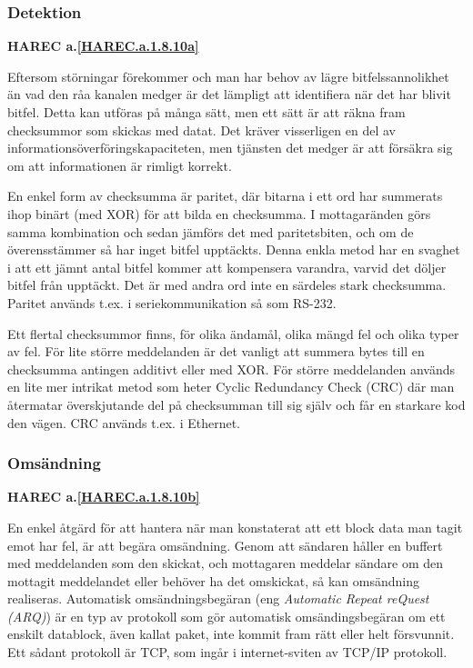 \subsubsection{Detektion}
\textbf{HAREC a.\ref{HAREC.a.1.8.10a}\label{myHAREC.a.1.8.10a}}
\begin{rev-nytt}[MAD]

Eftersom störningar förekommer och man har behov av lägre bitfelssannolikhet
än vad den råa kanalen medger är det lämpligt att identifiera när det har
blivit bitfel. Detta kan utföras på många sätt, men ett sätt är att räkna fram
checksummor som skickas med datat. Det kräver visserligen en del av
informationsöverföringskapaciteten, men tjänsten det medger är att försäkra sig
om att informationen är rimligt korrekt.

En enkel form av checksumma är paritet, där bitarna i ett ord har summerats ihop
binärt (med XOR) för att bilda en checksumma. I mottagaränden görs samma
kombination och sedan jämförs det med paritetsbiten, och om de överensstämmer så
har inget bitfel upptäckts. Denna enkla metod har en svaghet i att ett jämnt
antal bitfel kommer att kompensera varandra, varvid det döljer bitfel från
upptäckt. Det är med andra ord inte en särdeles stark checksumma. Paritet
används t.ex. i seriekommunikation så som RS-232.

Ett flertal checksummor finns, för olika ändamål, olika mängd fel och olika
typer av fel. För lite större meddelanden är det vanligt att summera bytes
till en checksumma antingen additivt eller med XOR. För större meddelanden
används en lite mer intrikat metod som heter Cyclic Redundancy Check (CRC)
där man återmatar överskjutande del på checksumman till sig själv och får en
starkare kod den vägen. CRC används t.ex. i Ethernet.

\end{rev-nytt}

\subsubsection{Omsändning}
\textbf{HAREC a.\ref{HAREC.a.1.8.10b}\label{myHAREC.a.1.8.10b}}
\begin{rev-nytt}[MAD]

En enkel åtgärd för att hantera när man konstaterat att ett block data man
tagit emot har fel, är att begära omsändning. Genom att sändaren håller en
buffert med meddelanden som den skickat, och mottagaren meddelar sändare om
den mottagit meddelandet eller behöver ha det omskickat, så kan omsändning
realiseras. Automatisk omsändningsbegäran (eng \emph{Automatic Repeat reQuest
(ARQ)}) är en typ av protokoll som gör automatisk omsändingsbegäran om ett
enskilt datablock, även kallat paket, inte kommit fram rätt eller helt
försvunnit. Ett sådant protokoll är TCP, som ingår i internet-sviten av TCP/IP
protokoll.

\end{rev-nytt}

